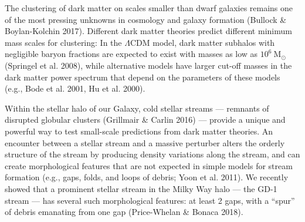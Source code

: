 \documentclass[11pt]{article}
\date{}
\author{}
\newcommand{\msun}{\textrm{M}_\odot}
\begin{document}
\maketitle

\vspace{-1em}
The clustering of dark matter on scales smaller than dwarf galaxies remains one of the most pressing unknowns in cosmology and galaxy formation (Bullock \& Boylan-Kolchin 2017).
Different dark matter theories predict different minimum mass scales for clustering: In the $\Lambda$CDM model, dark matter subhalos with negligible baryon fractions are expected to exist with masses as low as $10^{6}~\msun$ (Springel et al. 2008), while alternative models have larger cut-off masses in the dark matter power spectrum that depend on the parameters of these models (e.g., Bode et al. 2001, Hu et al. 2000).

Within the stellar halo of our Galaxy, cold stellar streams --- remnants of disrupted globular clusters (Grillmair \& Carlin 2016) --- provide a unique and powerful way to test small-scale predictions from dark matter theories.
An encounter between a stellar stream and a massive perturber alters the orderly structure of the stream by producing density variations along the stream, and can create morphological features that are not expected in simple models for stream formation (e.g., gaps, folds, and loops of debris; Yoon et al. 2011).
We recently showed that a prominent stellar stream in the Milky Way halo --- the GD-1 stream --- has several such morphological features: at least 2 gaps, with a ``spur'' of debris emanating from one gap (Price-Whelan \& Bonaca 2018).
\end{document}
